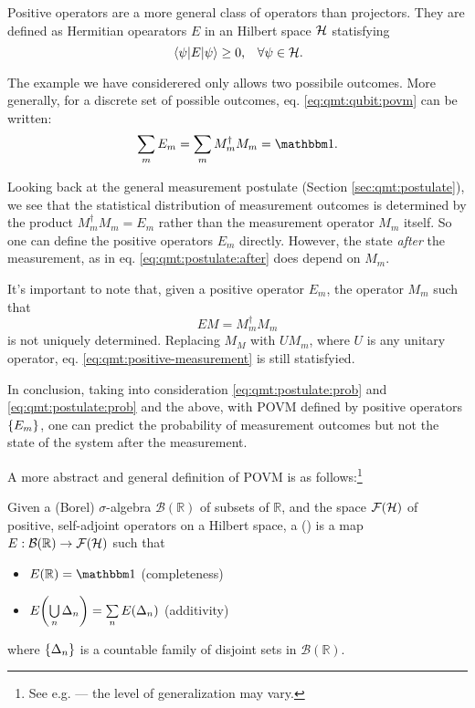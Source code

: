 Positive operators are a more general class of operators than projectors.
They are defined as Hermitian opearators $E$ in an Hilbert space $\mathcal{H}$ statisfying
\[
  \ev{E}{\psi} \ge 0 \text{,}\quad \forall \psi \in \hilb{H}.
\]

The example we have considerered only allows two possibile outcomes.
More generally, for a discrete set of possible outcomes, 
eq. \eqref{eq:qmt:qubit:povm} can be written:
\begin{equation}
  \sum_m E_m = \sum_m M_m^{\dagger} M_m = \idop \text{.}
\end{equation}

Looking back at the general measurement postulate (Section \ref{sec:qmt:postulate}),
we see that the statistical distribution of measurement outcomes
is determined by the product $M_m^{\dagger} M_m = E_m$ rather than the
measurement operator $M_m$ itself. So one can define the positive operators $E_m$ directly.
However, the state \emph{after} the measurement, as in eq. \eqref{eq:qmt:postulate:after}
does depend on $M_m$.

It's important to note that, given a positive operator $E_m$, the operator
$M_m$ such that
\begin{equation}\label{eq:qmt:positive-measurement}
  EM = M_{m}^{\dagger} M_m
\end{equation}
is not uniquely determined. Replacing $M_M$ with $UM_m$, where $U$ is any unitary operator,
eq. \eqref{eq:qmt:positive-measurement} is still statisfyied.

In conclusion, taking into consideration \eqref{eq:qmt:postulate:prob} and
\eqref{eq:qmt:postulate:prob} and the above, with POVM defined by positive operators $\left\{E_m\right\}$,
one can predict the probability of measurement outcomes but not the state of the system after the measurement.


\noindent\hrulefill

A more abstract and general definition of POVM is as
follows:\footnote{
  See e.g. \cite{BeneduciPhD, Berberian} --- the level of generalization may vary.
}
\begin{definition}
  Given a (Borel) $\sigma$-algebra $\mathcal{B}(\mathbb{R})$ of subsets of $\mathbb{R}$,
  and the space $\mathcal{F}(\mathcal{H})$ of positive, self-adjoint operators on a Hilbert space,
  a  ()
  is a map $E: \mathcal{B}(\mathbb{R}) \rightarrow \mathcal{F}(\mathcal{H})$
  such that
  \begin{itemize}
    \item $E(\mathbb{R}) = \idop$ (completeness)
    \item $E\qty(\bigcup\limits_{n} \Delta_n) = \sum\limits_{n} E\qty(\Delta_n)$ (additivity) 
  \end{itemize}
  where $\left\{\Delta_n\right\}$ is a countable family of disjoint sets in
  $\mathcal{B}(\mathbb{R})$.
\end{definition}

